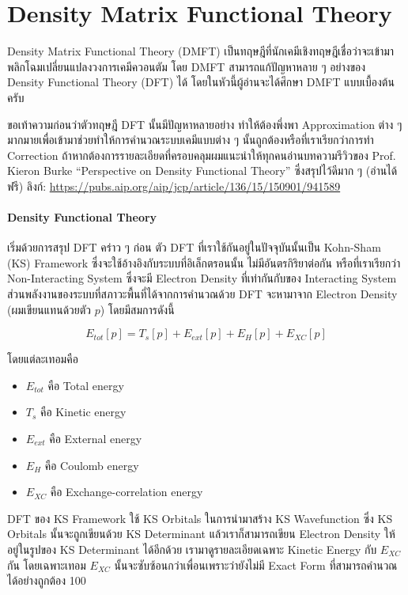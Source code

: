 \section{Density Matrix Functional Theory}

Density Matrix Functional Theory (DMFT) เป็นทฤษฎีที่นักเคมีเชิงทฤษฎีเชื่อว่าจะเข้ามาพลิกโฉมเปลี่ยนแปลงวงการเคมีควอนตัม
โดย DMFT สามารถแก้ปัญหาหลาย ๆ อย่างของ Density Functional Theory (DFT) ได้ โดยในหัวนี้ผู้อ่านจะได้ศึกษา DMFT แบบเบื้องต้นครับ

ขอเท้าความก่อนว่าตัวทฤษฎี DFT นั้นมีปัญหาหลายอย่าง ทำให้ต้องพึ่งพา Approximation ต่าง ๆ มากมายเพื่อเข้ามาช่วยทำให้การคำนวณระบบเคมีแบบต่าง ๆ
นั้นถูกต้องหรือที่เราเรียกว่าการทำ Correction ถ้าหากต้องการรายละเอียดที่ครอบคลุมผมแนะนำให้ทุกคนอ่านบทความรีวิวของ Prof. Kieron Burke
\enquote{Perspective on Density Functional Theory} ซึ่งสรุปไว้ดีมาก ๆ (อ่านได้ฟรี)
ลิงก์: \url{https://pubs.aip.org/aip/jcp/article/136/15/150901/941589}

\paragraph{Density Functional Theory}

เริ่มด้วยการสรุป DFT คร่าว ๆ ก่อน ตัว DFT ที่เราใช้กันอยู่ในปัจจุบันนั้นเป็น Kohn-Sham (KS) Framework ซึ่งจะใช้อ้างอิงกับระบบที่อิเล็กตรอนนั้น%
ไม่มีอันตรกิริยาต่อกัน หรือที่เราเรียกว่า Non-Interacting System ซึ่งจะมี Electron Density ที่เท่ากันกับของ Interacting System
ส่วนพลังงานของระบบที่สภาวะพื้นที่ได้จากการคำนวณด้วย DFT จะหามาจาก Electron Density (ผมเขียนแทนด้วยตัว $p$) โดยมีสมการดังนี้

\begin{equation}
    E_{tot}[p] = T_{s}[p] + E_{ext}[p] + E_{H}[p] + E_{XC}[p]
\end{equation}

\noindent โดยแต่ละเทอมคือ
\begin{itemize}
    \item $E_{tot}$ คือ Total energy
    \item $T_{s}$ คือ Kinetic energy
    \item $E_{ext}$ คือ External energy
    \item $E_{H}$ คือ Coulomb energy
    \item $E_{XC}$ คือ Exchange-correlation energy
\end{itemize}

DFT ของ KS Framework ใช้ KS Orbitals ในการนำมาสร้าง KS Wavefunction ซึ่ง KS Orbitals นั้นจะถูกเขียนด้วย KS Determinant
แล้วเราก็สามารถเขียน Electron Density ให้อยู่ในรูปของ KS Determinant ได้อีกด้วย เรามาดูรายละเอียดเฉพาะ Kinetic Energy กับ
$E_{XC}$ กัน โดยเฉพาะเทอม $E_{XC}$ นั้นจะซับซ้อนกว่าเพื่อนเพราะว่ายังไม่มี Exact Form ที่สามารถคำนวณได้อย่างถูกต้อง 100%

